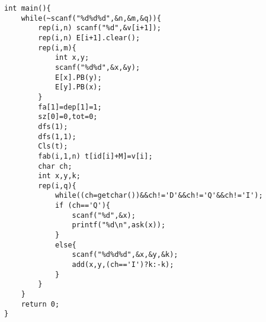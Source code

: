\begin{verbatim}
int main(){
    while(~scanf("%d%d%d",&n,&m,&q)){
        rep(i,n) scanf("%d",&v[i+1]);
        rep(i,n) E[i+1].clear();
        rep(i,m){
            int x,y;
            scanf("%d%d",&x,&y);
            E[x].PB(y);
            E[y].PB(x);
        }
        fa[1]=dep[1]=1;
        sz[0]=0,tot=0;
        dfs(1);
        dfs(1,1);
        Cls(t);
        fab(i,1,n) t[id[i]+M]=v[i];
        char ch;
        int x,y,k;
        rep(i,q){
            while((ch=getchar())&&ch!='D'&&ch!='Q'&&ch!='I');
            if (ch=='Q'){
                scanf("%d",&x);
                printf("%d\n",ask(x));
            }
            else{
                scanf("%d%d%d",&x,&y,&k);
                add(x,y,(ch=='I')?k:-k);
            }
        }
    }
    return 0;
}
\end{verbatim}
